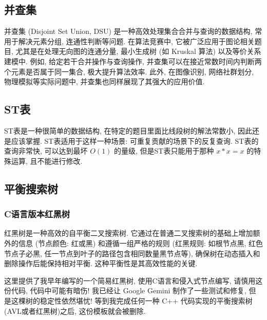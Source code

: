 \documentclass[a4paper]{ctexart}
\begin{document}


\subsection{并查集}

并查集 (Disjoint Set Union, DSU) 是一种高效处理集合合并与查询的数据结构, 常用于解决元素分组, 连通性判断等问题. 在算法竞赛中, 它被广泛应用于图论相关题目, 尤其是在处理无向图的连通分量, 最小生成树 (如 Kruskal 算法) 以及等价关系建模中. 例如, 给定若干合并操作与查询操作, 并查集可以在接近常数时间内判断两个元素是否属于同一集合, 极大提升算法效率. 此外, 在图像识别, 网络社群划分, 物理模拟等实际问题中, 并查集也同样展现了其强大的应用价值.



\subsection{ST表}

ST表是一种很简单的数据结构, 在特定的题目里面比线段树的解法常数小, 因此还是应该掌握. ST表适用于这样一种场景: 可重复贡献的场景下的反复查询. ST表的查询非常快, 可以达到最坏 $O(1)$ 的量级, 但是ST表只能用于那种 $x*x=x$ 的特殊运算, 且不能进行修改.



\subsection{平衡搜索树}

\subsubsection*{C语言版本红黑树}

红黑树是一种高效的自平衡二叉搜索树. 它通过在普通二叉搜索树的基础上增加额外的信息 (节点颜色: 红或黑) 和遵循一组严格的规则 (红黑规则: 如根节点黑, 红色节点子必黑, 任一节点到叶子的路径包含相同数量黑节点等), 确保树在动态插入和删除操作后能保持相对平衡. 这种平衡性是其高效性能的关键.

这里提供了我早年编写的一个简易红黑树, 使用C语言和侵入式节点编写, 请慎用这份代码, 代码中可能有暗伤! 我已经让 Google Gemini 制作了一些测试和修复, 但是这棵树的稳定性依然堪忧! 等到我完成任何一种 C++ 代码实现的平衡搜索树(AVL或者红黑树)之后, 这份模板就会被删除.
\end{document}

